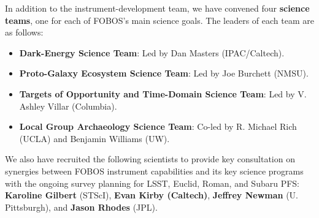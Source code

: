 \documentclass[oneside,11pt]{amsart}
\begin{document}
\noindent In addition to the instrument-development team, we have
convened four {\bf science teams}, one for each of FOBOS's main science goals.  The leaders of each team are as follows:
%
\begin{itemize}
%
\item {\bf Dark-Energy Science Team}: Led by Dan Masters (IPAC/Caltech).\\[-5pt]
%
\item {\bf Proto-Galaxy Ecosystem Science Team}: Led by Joe Burchett (NMSU).\\[-5pt]
%
\item {\bf  Targets of Opportunity and Time-Domain Science Team}: Led by V. Ashley Villar (Columbia).\\[-5pt]
%
\item {\bf  Local Group Archaeology Science Team}: Co-led by R. Michael Rich (UCLA) and Benjamin Williams (UW).
%
\end{itemize}

We also have recruited the following scientists to provide key consultation on synergies between FOBOS instrument capabilities and its key science programs with the ongoing survey planning for LSST, Euclid, Roman, and Subaru PFS: {\bf Karoline Gilbert} (STScI), {\bf Evan Kirby (Caltech)}, {\bf Jeffrey Newman} (U. Pittsburgh), and {\bf Jason Rhodes} (JPL).
\end{document}
